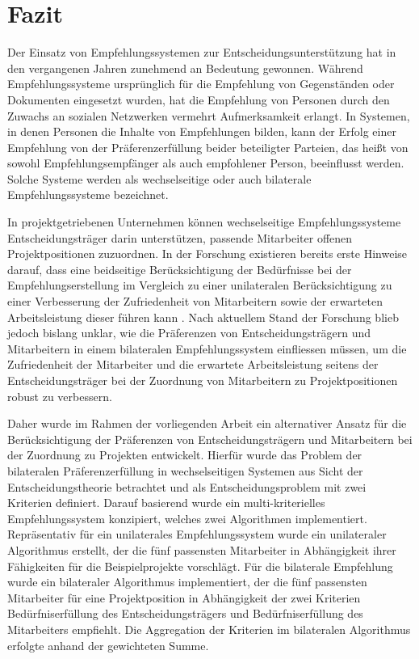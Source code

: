 
\chapter{Fazit}
\label{ch:fazit}
Der Einsatz von Empfehlungssystemen zur Entscheidungsunterstützung hat in den vergangenen Jahren zunehmend an Bedeutung gewonnen.
Während Empfehlungssysteme ursprünglich für die Empfehlung von Gegenständen oder Dokumenten eingesetzt wurden, hat die Empfehlung von Personen durch den Zuwachs an sozialen Netzwerken vermehrt Aufmerksamkeit erlangt.
In Systemen, in denen Personen die Inhalte von Empfehlungen bilden, kann der Erfolg einer Empfehlung von der Präferenzerfüllung beider beteiligter Parteien, das heißt von sowohl Empfehlungsempfänger als auch empfohlener Person, beeinflusst werden.
Solche Systeme werden als wechselseitige oder auch bilaterale Empfehlungssysteme bezeichnet.

In projektgetriebenen Unternehmen können wechselseitige Empfehlungssysteme Entscheidungsträger darin unterstützen, passende Mitarbeiter offenen Projektpositionen zuzuordnen.
In der Forschung existieren bereits erste Hinweise darauf, dass eine beidseitige Berücksichtigung der Bedürfnisse bei der Empfehlungserstellung im Vergleich zu einer unilateralen Berücksichtigung zu einer Verbesserung der Zufriedenheit von Mitarbeitern sowie der erwarteten Arbeitsleistung dieser führen kann \cite[S. 3]{link:booklet}.
Nach aktuellem Stand der Forschung blieb jedoch bislang unklar, wie die Präferenzen von Entscheidungsträgern und Mitarbeitern in einem bilateralen Empfehlungssystem einfliessen müssen, um die Zufriedenheit der Mitarbeiter und die erwartete Arbeitsleistung seitens der Entscheidungsträger bei der Zuordnung von Mitarbeitern zu Projektpositionen robust zu verbessern.

Daher wurde im Rahmen der vorliegenden Arbeit ein alternativer Ansatz für die Berücksichtigung der Präferenzen von Entscheidungsträgern und Mitarbeitern bei der Zuordnung zu Projekten entwickelt.
Hierfür wurde das Problem der bilateralen Präferenzerfüllung in wechselseitigen Systemen aus Sicht der Entscheidungstheorie betrachtet und als Entscheidungsproblem mit zwei Kriterien definiert.
Darauf basierend wurde ein multi-kriterielles Empfehlungssystem konzipiert, welches zwei Algorithmen implementiert.
Repräsentativ für ein unilaterales Empfehlungssystem wurde ein unilateraler Algorithmus erstellt, der die fünf passensten Mitarbeiter in Abhängigkeit ihrer Fähigkeiten für die Beispielprojekte vorschlägt.
Für die bilaterale Empfehlung wurde ein bilateraler Algorithmus implementiert, der die fünf passensten Mitarbeiter für eine Projektposition in Abhängigkeit der zwei Kriterien Bedürfniserfüllung des Entscheidungsträgers und Bedürfniserfüllung des Mitarbeiters empfiehlt.
Die Aggregation der Kriterien im bilateralen Algorithmus erfolgte anhand der gewichteten Summe.

